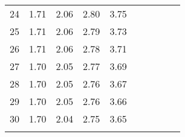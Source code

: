 \begin{table}[H]
{\begin{tabular}[t]{r *{4}{S[table-format=1.2]} | r *{4}{S[table-format=1.2]}}
24 & 1.71 & 2.06 & 2.80 & 3.75 &  &  &  &  & \\
25 & 1.71 & 2.06 & 2.79 & 3.73 &  &  &  &  & \\
26 & 1.71 & 2.06 & 2.78 & 3.71 &  &  &  &  & \\
27 & 1.70 & 2.05 & 2.77 & 3.69 &  &  &  &  & \\
28 & 1.70 & 2.05 & 2.76 & 3.67 &  &  &  &  & \\
29 & 1.70 & 2.05 & 2.76 & 3.66 &  &  &  &  & \\
30 & 1.70 & 2.04 & 2.75 & 3.65 &  &  &  &  & \\
\lspbottomrule
\end{tabular}}
\end{table}



